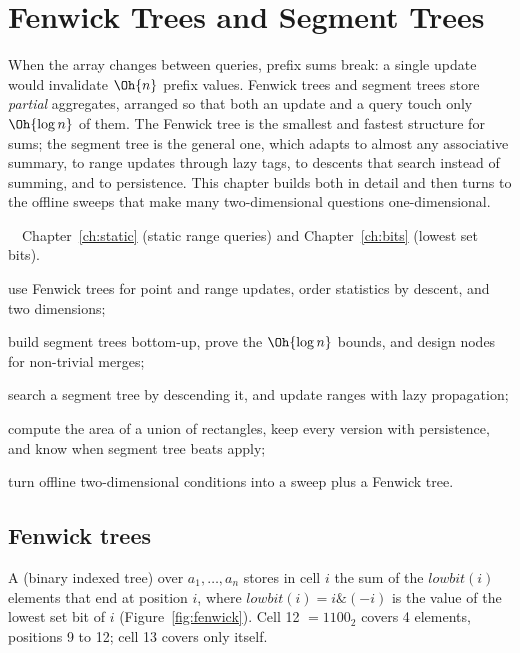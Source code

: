 \chapter{Fenwick Trees and Segment Trees}\label{ch:segtree}

When the array changes between queries, prefix sums break: a single update would invalidate $\Oh{n}$ prefix values. Fenwick trees
and segment trees store \emph{partial} aggregates, arranged so that both an update and a query touch only $\Oh{\log n}$ of them.
The Fenwick tree is the smallest and fastest structure for sums; the segment tree is the general one, which adapts to almost any
associative summary, to range updates through lazy tags, to descents that search instead of summing, and to persistence. This chapter
builds both in detail and then turns to the offline sweeps that make many two-dimensional questions one-dimensional.

\begin{chapterintro}{\gold\ \plat\ \ioi}{Chapter~\ref{ch:static} (static range queries) and Chapter~\ref{ch:bits}
(lowest set bits).}
  \item use Fenwick trees for point and range updates, order statistics by descent, and two dimensions;
  \item build segment trees bottom-up, prove the $\Oh{\log n}$ bounds, and design nodes for non-trivial merges;
  \item search a segment tree by descending it, and update ranges with lazy propagation;
  \item compute the area of a union of rectangles, keep every version with persistence, and know when segment tree beats apply;
  \item turn offline two-dimensional conditions into a sweep plus a Fenwick tree.
\end{chapterintro}

\section[Fenwick trees]{Fenwick trees \hfill \gold}\label{sec:fenwick}

A  (binary indexed tree) over $a_1, \dots, a_n$ stores in cell $i$ the sum of the $\mathit{lowbit}(i)$ elements
that end at position $i$, where $\mathit{lowbit}(i) = i \mathbin{\&} (-i)$ is the value of the lowest set bit of $i$
(Figure~\ref{fig:fenwick}). Cell 12 $= 1100_2$ covers 4 elements, positions 9 to 12; cell 13 covers only itself.

